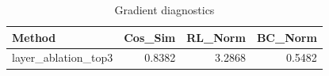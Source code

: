 \begin{table}[htbp]
\centering
\caption{Gradient diagnostics}
\label{tab:grad-diag}
\begin{tabular}{lrrr}
\toprule
\textbf{Method} & \textbf{Cos\_Sim} & \textbf{RL\_Norm} & \textbf{BC\_Norm} \\
\midrule
layer\_ablation\_top3 & 0.8382 & 3.2868 & 0.5482 \\
\bottomrule
\end{tabular}
\end{table}